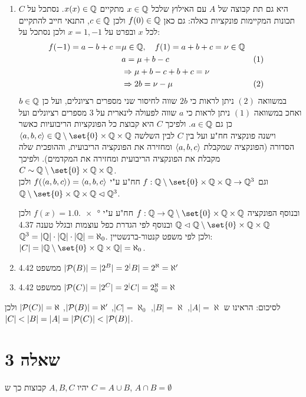 \documentclass{article}
\DeclarePairedDelimiter\set\{\}
\begin{document}
\begin{enumerate}
		\pagebreak
		\item $C$ היא גם תת קבוצה של $A$ עם האילוץ שלכל $x \in \mathbb{Q}$ מתקיים $x(x) \in \mathbb{Q}$.
		נסתכל על תכונות המקיימות פונקציות כאלה:
		גם כאן $f(0) \in \mathbb{Q}$ ולכן $c \in \mathbb{Q}$, התנאי חייב להתקיים לכל $x$ ובפרט על $x=1, -1$ ולכן נסתכל על:
		\begin{alignat*}{2}
			f(-1) = a - b + c = &\mu \in \mathbb{Q}, \quad f(1) = a + b + c = \nu \in \mathbb{Q} \\
			&a = \mu + b - c &&(1) \\
			&\Rightarrow
			\mu + b - c + b + c = \nu \\
			&\Rightarrow
			2b = \nu - \mu &&(2)
		\end{alignat*}
		במשוואה $(2)$ ניתן לראות כי $2b$ שווה לחיסור שני מספרים רציונלים, ועל כן ${b \in \mathbb{Q}}$ ואחכ במשוואה $(1)$ ניתן לראות כי $a$ שווה לפעולה לינארית על 3 מספרים רציונלים ועל כן גם $a \in \mathbb{Q}$.
		ולפיכך $C$ היא קבוצת כל הפונקציות הריבועיות כאשר \\
		${\ang{a,b,c} \in \QQ\sub\set{0} \times \QQ \times \QQ}$
		וישנה פונקציה חח"ע ועל בין $C$ לבין השלשה הסדורה (הפונקציה שמקבלת $\langle a,b,c \rangle$ ומחזירה את הפונקציה הריבועית, וההופכית שלה מקבלת את הפונקציה הריבועית ומחזירה את המקדמים).
		ולפיכך $C \sim \QQ\sub\set{0} \times \QQ \times \QQ$. \\
		וגם $f: \QQ\sub\set{0} \times \QQ \times \QQ \to \QQ^3$ חח"ע ע"י $f(\langle a,b,c \rangle) = \langle a,b,c \rangle$
		ולכן \\ ${\QQ\sub\set{0}\times \QQ \times \QQ \vartriangleleft \QQ^3}$.

		ובנוסף הפונקציה $f: \QQ \to \QQ\sub\set{0} \times \QQ \times \QQ$ חח"ע ע"י $f(x) = \ang{1,0,x}$
		ולכן $\QQ \vartriangleleft\QQ\sub\set{0} \times \QQ \times \QQ$
		ובנוסף לפי הגדרת כפל עוצמות ובגלל טענה 4.37 \\
		${\mathbb{Q}^3 = |\mathbb{Q}| \cdot |\mathbb{Q}| \cdot |\mathbb{Q}| = \aleph_0}$.
		ולכן לפי משפט קנטור-ברנשטיין:  \\
		${|C|=|\QQ\sub\set{0} \times \QQ \times \QQ| = \aleph_0}$.
		\item ממשפט 4.42 $|\mathcal{P}(B)| = |2^B| = 2^|B| = 2^\aleph = \aleph'$
		\item ממשפט 4.42 $|\mathcal{P}(C)| = |2^C| = 2^|C| = 2^\aleph_0 = \aleph$
	\end{enumerate}
	לסיכום: הראינו ש $|A| = \aleph$, $|B| = \aleph$, $|C| = \aleph_0$, $|\mathcal{P}(B)| = \aleph'$, $|\mathcal{P}(C)| = \aleph$
	ולכן $|C| < |B| = |A| = |\mathcal{P}(C)| < |\mathcal{P}(B)|$.


	\pagebreak

	\section*{שאלה 3}
	יהיו $A,B,C$ קבוצות כך ש $C = A \cup B$, $A \cap B = \emptyset$
\end{document}
